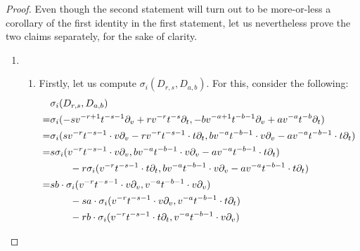             \begin{proof}
                Even though the second statement will turn out to be more-or-less a corollary of the first identity in the first statement, let us nevertheless prove the two claims separately, for the sake of clarity.
                \begin{enumerate}
                    \item
                    \begin{enumerate}
                        \item Firstly, let us compute $\sigma_i(D_{r, s}, D_{a, b})$. For this, consider the following:
                            $$
                                \begin{aligned}
                                    & \sigma_i(D_{r, s}, D_{a, b})
                                    \\
                                    = & \sigma_i( -s v^{-r + 1} t^{-s - 1} \del_v + r v^{-r} t^{-s} \del_t, -b v^{-a + 1} t^{-b - 1} \del_v + a v^{-a} t^{-b} \del_t )
                                    \\
                                    = & \sigma_i( s v^{-r} t^{-s - 1} \cdot v\del_v - r v^{-r} t^{-s - 1} \cdot t \del_t, b v^{-a} t^{-b - 1} \cdot v\del_v - a v^{-a} t^{-b - 1} \cdot t \del_t )
                                    \\
                                    = &
                                        s \sigma_i( v^{-r} t^{-s - 1} \cdot v\del_v, b v^{-a} t^{-b - 1} \cdot v\del_v - a v^{-a} t^{-b - 1} \cdot t \del_t )
                                        \\
                                        & \qquad - r \sigma_i( v^{-r} t^{-s - 1} \cdot t \del_t, b v^{-a} t^{-b - 1} \cdot v\del_v - a v^{-a} t^{-b - 1} \cdot t \del_t )
                                    \\
                                    = &
                                        s b \cdot \sigma_i( v^{-r} t^{-s - 1} \cdot v\del_v, v^{-a} t^{-b - 1} \cdot v\del_v )
                                        \\
                                        & \qquad - s a \cdot \sigma_i( v^{-r} t^{-s - 1} \cdot v\del_v, v^{-a} t^{-b - 1} \cdot t \del_t )
                                        \\
                                        & \qquad - r b \cdot \sigma_i( v^{-r} t^{-s - 1} \cdot t \del_t, v^{-a} t^{-b - 1} \cdot v\del_v )
                                        \\

\end{aligned}$$
\end{enumerate}
\end{enumerate}
\end{proof}
